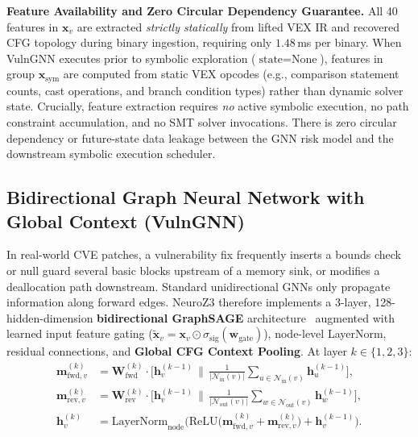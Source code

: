 \documentclass[10pt,conference]{IEEEtran}
\begin{document}
\textbf{Feature Availability and Zero Circular Dependency Guarantee.} All 40 features in $\mathbf{x}_v$ are extracted \emph{strictly statically} from lifted VEX IR and recovered CFG topology during binary ingestion, requiring only $1.48$\,ms per binary. When VulnGNN executes prior to symbolic exploration ($\text{state} = \text{None}$), features in group $\mathbf{x}_{\text{sym}}$ are computed from static VEX opcodes (e.g., comparison statement counts, cast operations, and branch condition types) rather than dynamic solver state. Crucially, feature extraction requires \emph{no} active symbolic execution, no path constraint accumulation, and no SMT solver invocations. There is zero circular dependency or future-state data leakage between the GNN risk model and the downstream symbolic execution scheduler.

\subsection{Bidirectional Graph Neural Network with Global Context (VulnGNN)}
In real-world CVE patches, a vulnerability fix frequently inserts a bounds check or null guard several basic blocks upstream of a
memory sink, or modifies a deallocation path downstream. Standard unidirectional GNNs only propagate information along forward
edges. NeuroZ3 therefore implements a 3-layer, 128-hidden-dimension \textbf{bidirectional GraphSAGE} architecture~\cite{hamilton2017graphsage}
augmented with learned input feature gating ($\tilde{\mathbf{x}}_v = \mathbf{x}_v \odot \sigma_{\text{sig}}(\mathbf{w}_{\text{gate}})$),
node-level LayerNorm, residual connections, and \textbf{Global CFG Context Pooling}. At layer $k \in \{1, 2, 3\}$:
\begin{align}
  \mathbf{m}_{\text{fwd}, v}^{(k)} &= \mathbf{W}_{\text{fwd}}^{(k)} \cdot \Big[ \mathbf{h}_v^{(k-1)} \,\Big\|\, \frac{1}{|\mathcal{N}_{\text{in}}(v)|} \sum_{u \in \mathcal{N}_{\text{in}}(v)} \mathbf{h}_u^{(k-1)} \Big], \label{eq:gnn_agg} \\
  \mathbf{m}_{\text{rev}, v}^{(k)} &= \mathbf{W}_{\text{rev}}^{(k)} \cdot \Big[ \mathbf{h}_v^{(k-1)} \,\Big\|\, \frac{1}{|\mathcal{N}_{\text{out}}(v)|} \sum_{w \in \mathcal{N}_{\text{out}}(v)} \mathbf{h}_w^{(k-1)} \Big], \label{eq:gnn_rev} \\
  \mathbf{h}_v^{(k)} &= \text{LayerNorm}_{\text{node}}\!\Big(\text{ReLU}\big(\mathbf{m}_{\text{fwd}, v}^{(k)} + \mathbf{m}_{\text{rev}, v}^{(k)}\big) + \mathbf{h}_v^{(k-1)}\Big). \label{eq:gnn_update}
\end{align}
\end{document}
